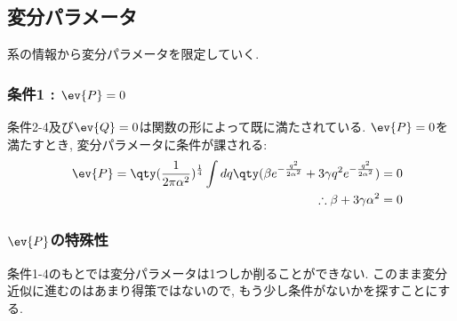 \documentclass[10.5pt,a4paper]{jreport}
\begin{document}
\subsection{変分パラメータ}
系の情報から変分パラメータを限定していく.
\subsubsection{条件1 : $\ev{P} = 0$}
条件2-4及び$\ev{Q} = 0$は関数の形によって既に満たされている. $\ev{P} = 0$を満たすとき, 変分パラメータに条件が課される:
\begin{eqnarray}
  &&\ev{P} = \qty(\frac{1}{2\pi\alpha^2})^\frac14\int dq \qty(\beta e^{-\frac{q^2}{2\alpha^2}} + 3\gamma q^2 e^{-\frac{q^2}{2\alpha^2}}) = 0\\
  &&\therefore \beta + 3\gamma\alpha^2 = 0 \label{condition1}
\end{eqnarray}
\subsubsection{$\ev{P}$の特殊性}
条件1-4のもとでは変分パラメータは1つしか削ることができない. このまま変分近似に進むのはあまり得策ではないので, もう少し条件がないかを探すことにする.
\end{document}

